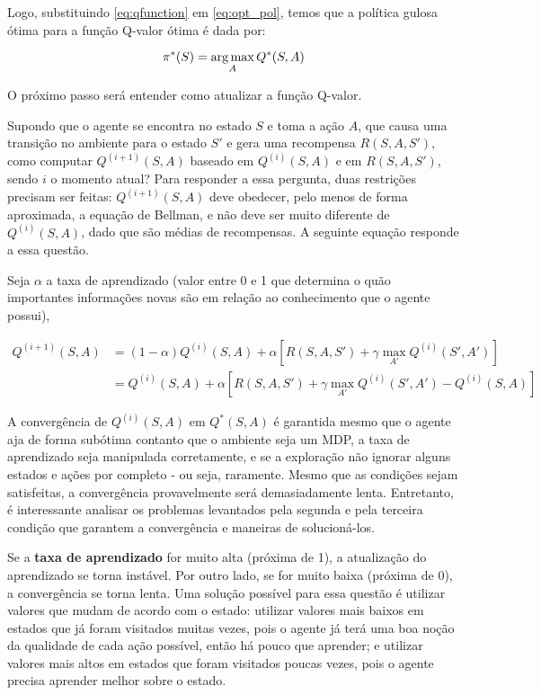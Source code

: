 Logo, substituindo \ref{eq:qfunction} em \ref{eq:opt_pol}, temos que a política gulosa ótima para a função Q-valor ótima é dada por:

\begin{equation} \label{eq:q_opt_pol}
\pi^{*}(S) = \operatorname*{arg\,max}_{A}Q^{*}(S,A)
\end{equation}

O próximo passo será entender como atualizar a função Q-valor.

Supondo que o agente se encontra no estado $S$ e toma a ação $A$, que causa uma transição no ambiente para o estado $S'$ e gera uma recompensa $R(S,A,S')$, como computar $Q^{(i+1)}(S,A)$ baseado em $Q^{(i)}(S,A)$ e em $R(S,A,S')$, sendo $i$ o momento atual?
Para responder a essa pergunta, duas restrições precisam ser feitas: $Q^{(i+1)}(S,A)$ deve obedecer, pelo menos de forma aproximada, a equação de Bellman, e não deve ser muito diferente de $Q^{(i)}(S,A)$, dado que são médias de recompensas.
A seguinte equação responde a essa questão.

Seja $\alpha$ a taxa de aprendizado (valor entre 0 e 1 que determina o quão importantes informações novas são em relação ao conhecimento que o agente possui),

\begin{equation} \label{eq:q_update}
\begin{align*}
Q^{(i+1)}(S,A) &= (1-\alpha)Q^{(i)}(S,A) + \alpha[R(S,A,S') + \gamma \max_{A'}Q^{(i)}(S',A')] \\
            &= Q^{(i)}(S,A) + \alpha[R(S,A,S') + \gamma \max_{A'}Q^{(i)}(S',A') - Q^{(i)}(S,A)]
\end{align*}
\end{equation}

A convergência de $Q^{(i)}(S,A)$ em $Q^{*}(S,A)$ é garantida mesmo que o agente aja de forma subótima contanto que o ambiente seja um MDP, a taxa de aprendizado seja manipulada corretamente, e se a exploração não ignorar alguns estados e ações por completo - ou seja, raramente.
Mesmo que as condições sejam satisfeitas, a convergência provavelmente será demasiadamente lenta.
Entretanto, é interessante analisar os problemas levantados pela segunda e pela terceira condição que garantem a convergência e maneiras de solucioná-los.

Se a \textbf{taxa de aprendizado} for muito alta (próxima de 1), a atualização do aprendizado se torna instável.
Por outro lado, se for muito baixa (próxima de 0), a convergência se torna lenta.
Uma solução possível para essa questão é utilizar valores que mudam de acordo com o estado: utilizar valores mais baixos em estados que já foram visitados muitas vezes, pois o agente já terá uma boa noção da qualidade de cada ação possível, então há pouco que aprender; e utilizar valores mais altos em estados que foram visitados poucas vezes, pois o agente precisa aprender melhor sobre o estado.

